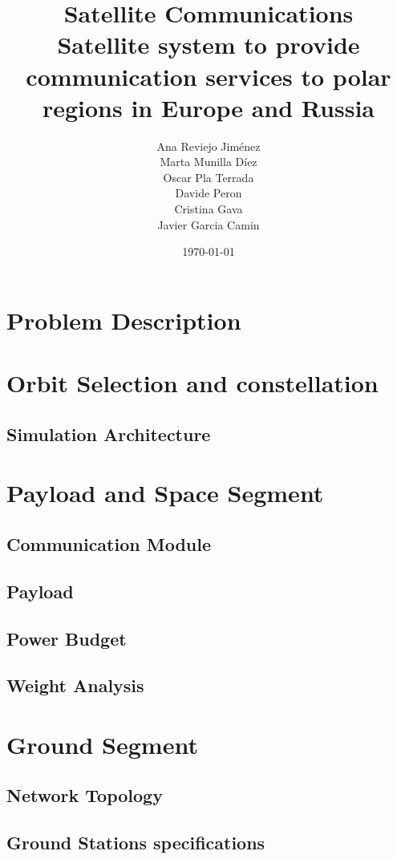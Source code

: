 \documentclass[11pt,a4paper,titlepage]{article}
\title{\blue Satellite Communications \\
\blueb Satellite system to provide communication services to polar regions in Europe and Russia}
\author{Ana Reviejo Jiménez \\ Marta Munilla Díez\\ Oscar Pla Terrada\\ Davide Peron\\ Cristina Gava\\ Javier Garcia Camin}
\date{\today}
\begin{document}
\maketitle

\tableofcontents
\clearpage

\section{Problem Description}
\lipsum[1-2]

\section{Orbit Selection and constellation}
	\lipsum[1]
	\subsection{Simulation Architecture}
	\lipsum[2]

\section{Payload and Space Segment}
	\lipsum[1]
	\subsection{Communication Module}
	\lipsum[1]
	\subsection{Payload}
	\lipsum[1]
	\subsection{Power Budget}
	\lipsum[1]
	\subsection{Weight Analysis}
	\lipsum[1]

\section{Ground Segment}
	\lipsum[1]
	\subsection{Network Topology}
	\lipsum[1]
	\subsection{Ground Stations specifications}
	\lipsum[1]
\end{document}

